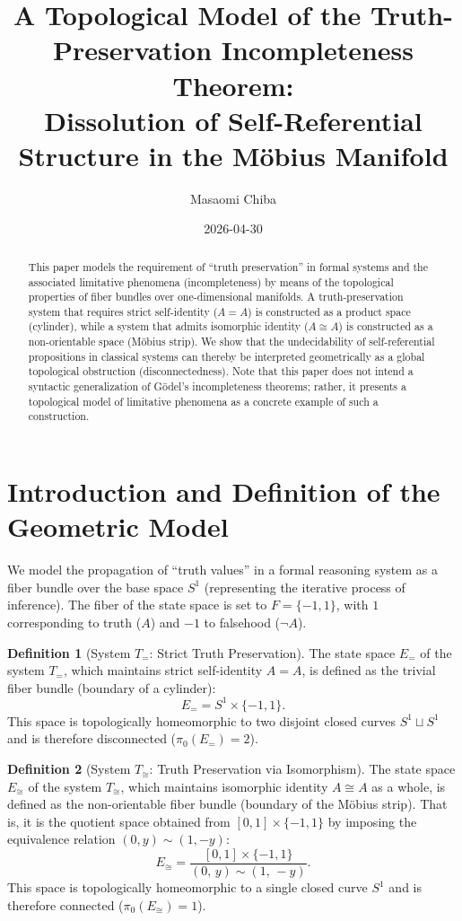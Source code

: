 \documentclass[11pt,a4paper]{article}
\title{A Topological Model of the Truth-Preservation Incompleteness Theorem:\\
Dissolution of Self-Referential Structure in the M\"{o}bius Manifold}
\author{Masaomi Chiba}
\date{2026-04-30}
\theoremstyle{definition}
\newtheorem{definition}{Definition}[section]
\begin{document}
\maketitle

\begin{abstract}
This paper models the requirement of ``truth preservation'' in formal systems and the associated limitative phenomena (incompleteness) by means of the topological properties of fiber bundles over one-dimensional manifolds. A truth-preservation system that requires strict self-identity ($A = A$) is constructed as a product space (cylinder), while a system that admits isomorphic identity ($A \cong A$) is constructed as a non-orientable space (M\"{o}bius strip). We show that the undecidability of self-referential propositions in classical systems can thereby be interpreted geometrically as a global topological obstruction (disconnectedness). Note that this paper does not intend a syntactic generalization of G\"{o}del's incompleteness theorems; rather, it presents a topological model of limitative phenomena as a concrete example of such a construction.
\end{abstract}

\section{Introduction and Definition of the Geometric Model}

We model the propagation of ``truth values'' in a formal reasoning system as a fiber bundle over the base space $S^1$ (representing the iterative process of inference). The fiber of the state space is set to $F = \{-1, 1\}$, with $1$ corresponding to truth ($A$) and $-1$ to falsehood ($\neg A$).

\begin{definition}[System $T_{=}$: Strict Truth Preservation]
The state space $E_{=}$ of the system $T_{=}$, which maintains strict self-identity $A = A$, is defined as the trivial fiber bundle (boundary of a cylinder):
$$ E_{=} = S^1 \times \{-1, 1\}. $$
This space is topologically homeomorphic to two disjoint closed curves $S^1 \sqcup S^1$ and is therefore disconnected ($\pi_0(E_{=}) = 2$).
\end{definition}

\begin{definition}[System $T_{\cong}$: Truth Preservation via Isomorphism]
The state space $E_{\cong}$ of the system $T_{\cong}$, which maintains isomorphic identity $A \cong A$ as a whole, is defined as the non-orientable fiber bundle (boundary of the M\"{o}bius strip). That is, it is the quotient space obtained from $[0, 1] \times \{-1, 1\}$ by imposing the equivalence relation $(0, y) \sim (1, -y)$:
$$ E_{\cong} = \frac{[0, 1] \times \{-1, 1\}}{(0,\, y) \sim (1,\, -y)}. $$
This space is topologically homeomorphic to a single closed curve $S^1$ and is therefore connected ($\pi_0(E_{\cong}) = 1$).
\end{definition}
\end{document}
